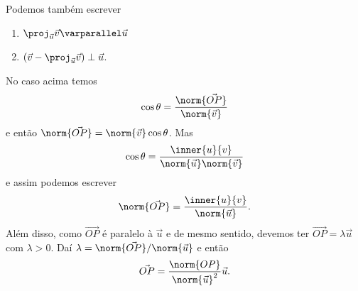 Podemos também escrever
\begin{enumerate}
  \item $\proj_{\vec{u}}\vec{v} \varparallel\vec{u}$
    \item $(\vec{v} - \proj_{\vec{u}}\vec{v}) \perp \vec{u}$.
\end{enumerate}

No caso acima temos
\[
  \cos\theta = \dfrac{\norm{\vec{OP}}}{\norm{\vec{v}}}
\]
e então $\norm{\vec{OP}} = \norm{\vec{v}}\cos\theta$. Mas
\[
  \cos\theta = \dfrac{\inner{u}{v}}{\norm{\vec{u}}\norm{\vec{v}}}
\]
e assim podemos escrever
\[
  \norm{\vec{OP}} = \dfrac{\inner{u}{v}}{\norm{\vec{u}}}.
\]
Além disso, como $\vec{OP}$ é paralelo à $\vec{u}$ e de mesmo sentido, devemos ter $\vec{OP} = \lambda\vec{u}$ com $\lambda > 0$. Daí
$\lambda = \norm{\vec{OP}}/\norm{\vec{u}}$ e então
\[
  \vec{OP} = \dfrac{\norm{OP}}{\norm{\vec{u}}^2}\vec{u}.
\]

